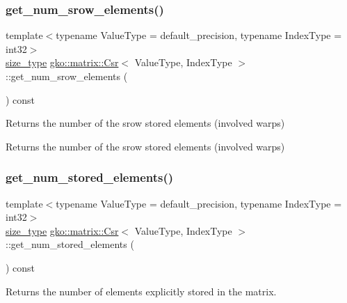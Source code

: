 \subsubsection{\texorpdfstring{get\+\_\+num\+\_\+srow\+\_\+elements()}{get\_num\_srow\_elements()}}
{\footnotesize\ttfamily template$<$typename Value\+Type = default\+\_\+precision, typename Index\+Type = int32$>$ \\
\hyperlink{namespacegko_a6e5c95df0ae4e47aab2f604a22d98ee7}{size\+\_\+type} \hyperlink{classgko_1_1matrix_1_1Csr}{gko\+::matrix\+::\+Csr}$<$ Value\+Type, Index\+Type $>$\+::get\+\_\+num\+\_\+srow\+\_\+elements (\begin{DoxyParamCaption}{ }\end{DoxyParamCaption}) const\hspace{0.3cm}{\ttfamily [noexcept]}}



Returns the number of the srow stored elements (involved warps) 

\begin{DoxyReturn}{Returns}
the number of the srow stored elements (involved warps) 
\end{DoxyReturn}
\mbox{\label{classgko_1_1matrix_1_1Csr_ab70c085fc3df11a4ed9fe74b40844c5c}} 
\subsubsection{\texorpdfstring{get\+\_\+num\+\_\+stored\+\_\+elements()}{get\_num\_stored\_elements()}}
{\footnotesize\ttfamily template$<$typename Value\+Type = default\+\_\+precision, typename Index\+Type = int32$>$ \\
\hyperlink{namespacegko_a6e5c95df0ae4e47aab2f604a22d98ee7}{size\+\_\+type} \hyperlink{classgko_1_1matrix_1_1Csr}{gko\+::matrix\+::\+Csr}$<$ Value\+Type, Index\+Type $>$\+::get\+\_\+num\+\_\+stored\+\_\+elements (\begin{DoxyParamCaption}{ }\end{DoxyParamCaption}) const\hspace{0.3cm}{\ttfamily [noexcept]}}



Returns the number of elements explicitly stored in the matrix. 

